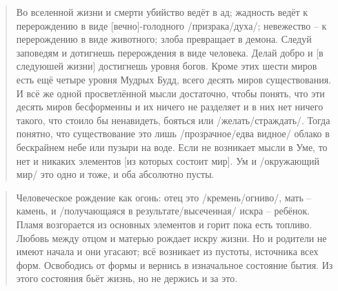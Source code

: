 \begin{ver}
  \begin{quote}
    Во вселенной жизни и смерти убийство ведёт в
    ад; жадность ведёт к перерождению в виде [вечно]-голодного
    /призрака/духа/; невежество -- к перерождению в виде животного;
    злоба превращает в демона. Следуй заповедям и дотигнешь
    перерождения в виде человека. Делай добро и [в следуюшей жизни]
    достигнешь уровня богов. Кроме этих шести миров есть
    ещё четыре уровня Мудрых Будд, всего десять миров существования.
    И всё же одной просветлённой мысли достаточно, чтобы понять, что
    эти десять миров бесформенны и их ничего не разделяет и в них нет
    ничего такого, что стоило бы ненавидеть, бояться или
    /желать/страждать/. Тогда понятно, что существование это лишь
    /прозрачное/едва видное/ облако в бескрайнем небе или
    пузыри на воде. Если не возникает мысли в Уме, то нет и никаких
    элементов [из которых состоит мир]. Ум и /окружающий
    мир/ это одно и тоже, и оба абсолютно пусты.
  \end{quote}
\end{ver}

\begin{ver}
  \begin{quote}
    Человеческое рождение как огонь: отец это /кремень/огниво/, мать
    -- камень, и /получающаяся в
    результате/высеченная/ искра -- ребёнок.
    Пламя возгорается из основных элементов и горит пока есть топливо.
    Любовь между отцом и матерью рождает искру жизни. Но и родители не
    имеют начала и они угасают; всё возникает из пустоты, источника
    всех форм. Освободись от формы и вернись в изначальное состояние
    бытия. Из этого состояния бьёт жизнь, но не держись и за это.
  \end{quote}
\end{ver}

